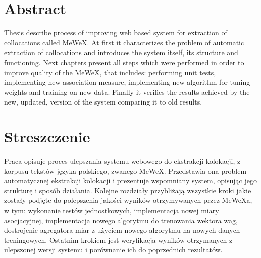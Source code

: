 \section*{Abstract}
Thesis describe process of improving web based system for extraction of
collocations called MeWeX. At first it characterizes the problem of automatic extraction of collocations 
and introduces the system itself, its structure and functioning. Next chapters present all steps 
which were performed in order to improve quality of the MeWeX, that includes: performing unit tests,
implementing new association measure, implementing new algorithm for tuning
weights and training on new data. Finally it verifies the results achieved by the new, 
updated, version of the system comparing it to old results.

\vspace{5em}

\section*{Streszczenie}
Praca opisuje proces ulepszania systemu webowego do ekstrakcji kolokacji, z korpusu tekstów języka polskiego, zwanego MeWeX.
Przedstawia ona problem automatycznej ekstrakcji kolokacji i prezentuje wspomniany system, opisując jego strukturę i 
sposób działania. Kolejne rozdziały przybliżają wszystkie kroki jakie zostały podjęte do polepszenia jakości wyników 
otrzymywanych przez MeWeXa, w tym: wykonanie testów jednostkowych, implementacja nowej miary asocjacyjnej,
implementacja nowego algorytmu do trenowania wektora wag, dostrojenie agregatora miar z użyciem nowego algorytmu 
na nowych danych treningowych. Ostatnim krokiem jest weryfikacja wyników otrzymanych z ulepszonej wersji systemu 
i porównanie ich do poprzednich rezultatów.